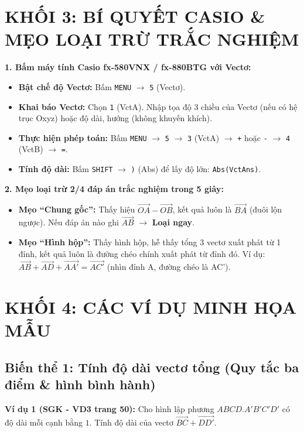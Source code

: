 \documentclass[12pt,a4paper]{article}
\begin{document}
\section*{KHỐI 3: BÍ QUYẾT CASIO \& MẸO LOẠI TRỪ TRẮC NGHIỆM}
\begin{tcolorbox}[colback=orange!5!white,colframe=orange!75!black,title=\textbf{Bí quyết bấm máy \& Mẹo chọn đáp án}]
\textbf{1. Bấm máy tính Casio fx-580VNX / fx-880BTG với Vectơ:}
\begin{itemize}
    \item \textbf{Bật chế độ Vectơ:} Bấm \texttt{MENU} $\rightarrow$ \texttt{5} (Vectơ).
    \item \textbf{Khai báo Vectơ:} Chọn \texttt{1} (VctA). Nhập tọa độ 3 chiều của Vectơ (nếu có hệ trục Oxyz) hoặc độ dài, hướng (không khuyến khích).
    \item \textbf{Thực hiện phép toán:} Bấm \texttt{MENU} $\rightarrow$ \texttt{5} $\rightarrow$ \texttt{3} (VctA) $\rightarrow$ \texttt{+} hoặc \texttt{-} $\rightarrow$ \texttt{4} (VctB) $\rightarrow$ \texttt{=}.
    \item \textbf{Tính độ dài:} Bấm \texttt{SHIFT} $\rightarrow$ \texttt{)} (Abs) để lấy độ lớn: \texttt{Abs(VctAns)}.
\end{itemize}

\textbf{2. Mẹo loại trừ 2/4 đáp án trắc nghiệm trong 5 giây:}
\begin{itemize}
    \item \textbf{Mẹo “Chung gốc”:} Thấy hiệu $\vec{OA} - \vec{OB}$, kết quả luôn là $\vec{BA}$ (đuôi lộn ngược). Nếu đáp án nào ghi $\vec{AB}$ $\rightarrow$ \textbf{Loại ngay}.
    \item \textbf{Mẹo “Hình hộp”:} Thấy hình hộp, hễ thấy tổng 3 vectơ xuất phát từ 1 đỉnh, kết quả luôn là đường chéo chính xuất phát từ đỉnh đó. Ví dụ: $\vec{AB} + \vec{AD} + \vec{AA'} = \vec{AC'}$ (nhìn đỉnh A, đường chéo là AC').
\end{itemize}
\end{tcolorbox}

\newpage

\section*{KHỐI 4: CÁC VÍ DỤ MINH HỌA MẪU}

\subsection*{Biến thể 1: Tính độ dài vectơ tổng (Quy tắc ba điểm \& hình bình hành)}
\textbf{Ví dụ 1 (SGK - VD3 trang 50):} Cho hình lập phương $ABCD.A'B'C'D'$ có độ dài mỗi cạnh bằng $1$. Tính độ dài của vectơ $\vec{BC} + \vec{DD'}$.
\end{document}
